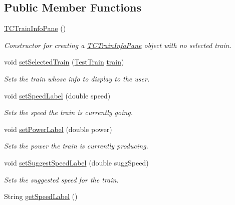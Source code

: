 \subsection*{Public Member Functions}
\begin{DoxyCompactItemize}
\item 
\hyperlink{classTrainControllerComps_1_1TCTrainInfoPane_adb9f574b995a252e6e1fc1ee73402801}{T\+C\+Train\+Info\+Pane} ()
\begin{DoxyCompactList}\small\item\em Constructor for creating a \hyperlink{classTrainControllerComps_1_1TCTrainInfoPane}{T\+C\+Train\+Info\+Pane} object with no selected train. \end{DoxyCompactList}\item 
void \hyperlink{classTrainControllerComps_1_1TCTrainInfoPane_aa3515128954b5bf339df6926d29e0424}{set\+Selected\+Train} (\hyperlink{classTrainControllerComps_1_1TestTrain}{Test\+Train} \hyperlink{classtrain}{train})
\begin{DoxyCompactList}\small\item\em Sets the train whose info to display to the user. \end{DoxyCompactList}\item 
void \hyperlink{classTrainControllerComps_1_1TCTrainInfoPane_aaa8d8d930a3d0cce4286f44e0600b820}{set\+Speed\+Label} (double speed)
\begin{DoxyCompactList}\small\item\em Sets the speed the train is currently going. \end{DoxyCompactList}\item 
void \hyperlink{classTrainControllerComps_1_1TCTrainInfoPane_a3ec6d080c4a75c031678b8d4620153d0}{set\+Power\+Label} (double power)
\begin{DoxyCompactList}\small\item\em Sets the power the train is currently producing. \end{DoxyCompactList}\item 
void \hyperlink{classTrainControllerComps_1_1TCTrainInfoPane_ab2965544592b8ee90697d9ad4c0d00de}{set\+Suggest\+Speed\+Label} (double sugg\+Speed)
\begin{DoxyCompactList}\small\item\em Sets the suggested speed for the train. \end{DoxyCompactList}\item 
String \hyperlink{classTrainControllerComps_1_1TCTrainInfoPane_a9146b41e4efe422586c69624f6e16e2f}{get\+Speed\+Label} ()

\end{DoxyCompactItemize}
